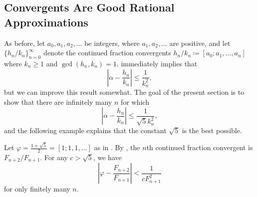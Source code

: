 \documentclass[../notes.tex]{subfiles}
\begin{document}
\subsection{Convergents Are Good Rational Approximations}
As before, let $a_0,a_1,a_2,\ldots$ be integers, where $a_1,a_2,\ldots$ are positive, and let $\{h_n/k_n\}_{n=0}^\infty$ denote the continued fraction convergents $h_n/k_n\coloneqq[a_0;a_1,\ldots,a_n]$ where $k_n\ge1$ and $\gcd(h_n,k_n)=1$.  immediately implies that
\[\left|\alpha-\frac{h_n}{k_n}\right|\le\frac1{k_n^2},\]
but we can improve this result somewhat. The goal of the present section is to show that there are infinitely many $n$ for which
\[\left|\alpha-\frac{h_n}{k_n}\right|\le\frac1{\sqrt 5k_n^2},\]
and the following example explains that the constant $\sqrt5$ is the best possible.
\begin{example} \label{ex:phi-hurwitz-sharp}
	Let $\varphi=\frac{1+\sqrt5}2=[1;1,1,\ldots]$ as in . By , the $n$th continued fraction convergent is $F_{n+2}/F_{n+1}$. For any $c>\sqrt5$, we have
	\[\left|\varphi-\frac{F_{n+2}}{F_{n+1}}\right|<\frac1{cF_{n+1}^2}\]
	for only finitely many $n$.
\end{example}
\end{document}
